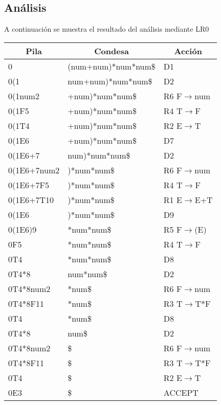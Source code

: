 \documentclass[11pt,a4paper]{article}
\begin{document}
\subsection{Análisis}
A continuación se muestra el resultado del análisis mediante LR0
\begin{center}

\begin{table}[h]
\begin{tabular}{|l|l|l|}
\hline
\multicolumn{1}{|c|}{\textbf{Pila}} & \multicolumn{1}{c|}{\textbf{Condesa}} & \multicolumn{1}{c|}{\textbf{Acción}} \\ \hline
0 & (num+num)*num*num\$ & D1 \\ \hline
0(1 & num+num)*num*num\$ & D2 \\ \hline
0(1num2 & +num)*num*num\$ & R6 F$\longrightarrow$num \\ \hline
0(1F5 & +num)*num*num\$ & R4 T$\longrightarrow$F \\ \hline
0(1T4 & +num)*num*num\$ & R2 E$\longrightarrow$T \\ \hline
0(1E6 & +num)*num*num\$ & D7 \\ \hline
0(1E6+7 & num)*num*num\$ & D2 \\ \hline
0(1E6+7num2 & )*num*num\$ & R6 F$\longrightarrow$num \\ \hline
0(1E6+7F5 & )*num*num\$ & R4 T$\longrightarrow$F \\ \hline
0(1E6+7T10 & )*num*num\$ & R1 E$\longrightarrow$E+T \\ \hline
0(1E6 & )*num*num\$ & D9 \\ \hline
0(1E6)9 & *num*num\$ & R5 F$\longrightarrow$(E) \\ \hline
0F5 & *num*num\$ & R4 T$\longrightarrow$F \\ \hline
0T4 & *num*num\$ & D8 \\ \hline
0T4*8 & num*num\$ & D2 \\ \hline
0T4*8num2 & *num\$ & R6 F$\longrightarrow$num \\ \hline
0T4*8F11 & *num\$ & R3 T$\longrightarrow$T*F \\ \hline
0T4 & *num\$ & D8 \\ \hline
0T4*8 & num\$ & D2 \\ \hline
0T4*8num2 & \$ & R6 F$\longrightarrow$num \\ \hline
0T4*8F11 & \$ & R3 T$\longrightarrow$T*F \\ \hline
0T4 & \$ & R2 E$\longrightarrow$T \\ \hline
0E3 & \$ & ACCEPT \\ \hline
\end{tabular}
\end{table}


\end{center}
\end{document}
